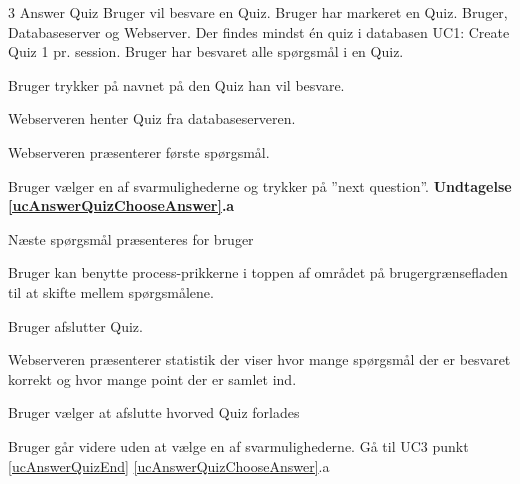 \uchead
	{3}
	{Answer Quiz}
	{Bruger vil besvare en Quiz.}
	{Bruger har markeret en Quiz.}
	{Bruger, Databaseserver og Webserver.}
	{Der findes mindst én quiz i databasen}
	{UC1: Create Quiz}
	{1 pr. session.}
	{Bruger har besvaret alle spørgsmål i en Quiz.}

\item Bruger trykker på navnet på den Quiz han vil besvare.

\item Webserveren henter Quiz fra databaseserveren.

\item\label{ucAnswerQuizPresent} Webserveren præsenterer første spørgsmål.

\item \label{ucAnswerQuizChooseAnswer} Bruger vælger en af svarmulighederne og trykker på ''next question''. 
\textbf{Undtagelse \ref{ucAnswerQuizChooseAnswer}.a}


\item\label{ucAnswerQuizEnd} Næste spørgsmål præsenteres for bruger 


\item Bruger kan benytte process-prikkerne i toppen af området på brugergrænsefladen til at skifte mellem spørgsmålene.


\item Bruger afslutter Quiz.


\item Webserveren præsenterer statistik der viser hvor mange spørgsmål der er besvaret korrekt og hvor mange point der er samlet ind.

\item Bruger vælger at afslutte hvorved Quiz forlades

\ucdescriptionend

\ucextension
	{Bruger går videre uden at vælge en af svarmulighederne.}
	{Gå til UC3 punkt \ref{ucAnswerQuizEnd}}
	{\ref{ucAnswerQuizChooseAnswer}.a}
	

